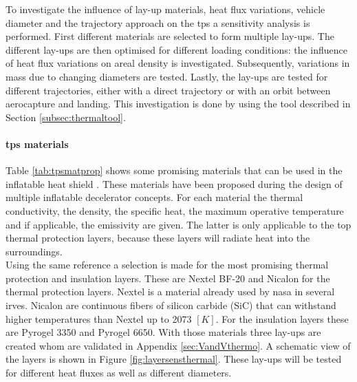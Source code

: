 To investigate the influence of lay-up materials, heat flux variations, vehicle diameter and the trajectory approach on the \gls{tps} a sensitivity analysis is performed. First different materials are selected to form multiple lay-ups. The different lay-ups are then optimised for different loading conditions: the influence of heat flux variations on areal density is investigated. Subsequently, variations in mass due to changing diameters are tested. Lastly, the lay-ups are tested for different trajectories, either with a direct trajectory or with an orbit between aerocapture and landing. This investigation is done by using the tool described in Section \ref{subsec:thermaltool}.

\paragraph{\gls{tps} materials}
Table \ref{tab:tpsmatprop} shows some promising materials that can be used in the inflatable heat shield \cite{Corso2009,Corso2011,DuPont2011,Smith2011}. These materials have been proposed during the design of multiple inflatable decelerator concepts. For each material the thermal conductivity, the density, the specific heat, the maximum operative temperature and if applicable, the emissivity are given. The latter is only applicable to the top  thermal protection layers, because these layers will radiate heat into the surroundings.\\

Using the same reference a selection is made for the most promising thermal protection and insulation layers. These are Nextel BF-20 and Nicalon for the thermal protection layers. Nextel is a material already used by \gls{nasa} in several \gls{irve}s. Nicalon are continuous fibers of silicon carbide (SiC) that can withstand higher temperatures than Nextel up to 2073 $\left[K\right]$. For the insulation layers these are Pyrogel 3350 and Pyrogel 6650. With those materials three lay-ups are created whom are validated in Appendix \ref{sec:VandVthermo}. A schematic view of the layers is shown in Figure \ref{fig:layersensthermal}. These lay-ups will be tested for different heat fluxes as well as different diameters.


